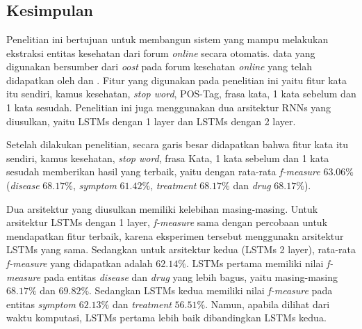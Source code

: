 \chapter{\babEnam}

\section{Kesimpulan}
Penelitian ini bertujuan untuk membangun sistem yang mampu melakukan ekstraksi entitas kesehatan dari forum \textit{online} secara otomatis. data yang digunakan bersumber dari \textit{oost} pada forum kesehatan \textit{online} yang telah didapatkan oleh \cite{skripsiKakRadit} dan \saya. Fitur yang digunakan pada penelitian ini yaitu fitur kata itu sendiri, kamus kesehatan, \textit{stop word}, POS-Tag, frasa kata,  1 kata sebelum dan 1 kata sesudah. Penelitian ini juga menggunakan dua arsitektur RNNs yang diusulkan, yaitu LSTMs dengan 1 layer dan LSTMs dengan 2 layer.

Setelah dilakukan penelitian, secara garis besar didapatkan bahwa fitur kata itu sendiri, kamus kesehatan, \textit{stop word}, frasa Kata,  1 kata sebelum dan 1 kata sesudah memberikan hasil yang terbaik, yaitu dengan rata-rata \textit{f-measure} $ 63.06\% $ (\textit{disease} $ 68.17\% $, \textit{symptom} $ 61.42\% $, \textit{treatment} $ 68.17\% $ dan \textit{drug} $ 68.17\% $).

Dua arsitektur yang diusulkan memiliki kelebihan masing-masing. Untuk arsitektur LSTMs dengan 1 layer, \textit{f-measure} sama dengan percobaan untuk mendapatkan fitur terbaik, karena eksperimen tersebut menggunakn arsitektur LSTMs yang sama. Sedangkan untuk arsitektur kedua (LSTMs 2 layer), rata-rata \textit{f-measure} yang didapatkan adalah $ 62.14\% $. LSTMs pertama memiliki nilai \textit{f-measure} pada entitas \textit{disease} dan \textit{drug} yang lebih bagus, yaitu masing-masing $ 68.17\% $ dan $ 69.82\% $. Sedangkan LSTMs kedua memiliki nilai \textit{f-measure} pada entitas \textit{symptom} $ 62.13\% $ dan \textit{treatment} $ 56.51\% $. Namun, apabila dilihat dari waktu komputasi, LSTMs pertama lebih baik dibandingkan LSTMs kedua.

